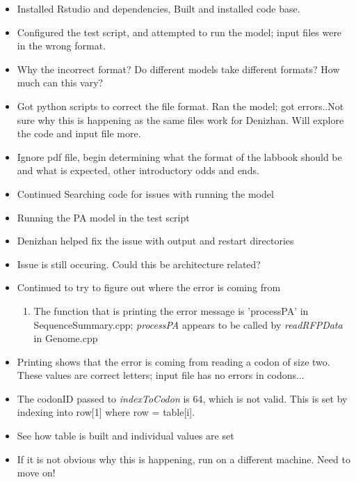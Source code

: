 \documentclass[12pt,hyperref]{labbook}
\begin{document}
\begin{itemize}
	\item Installed Rstudio and dependencies, Built and installed code base.
	\item Configured the test script, and attempted to run the model;
        input files were in the wrong format.
\end{itemize}
\begin{itemize}
  \item Why the incorrect format? Do different models take different formats?
How much can this vary?
\end{itemize}

 
\begin{itemize}
	\item Got python scripts to correct the file format. Ran the model;
got errors..Not sure why this is happening as the same files work for Denizhan.
Will explore the code and input file more.
	\item Ignore pdf file, begin determining what the format of the
labbook should be and what is expected, other introductory odds and ends.
  \item Continued Searching code for issues with running the model
\end{itemize}
\begin{itemize}
  \item Running the PA model in the test script
  \item Denizhan helped fix the issue with output and restart directories
  \item Issue is still occuring. Could this be architecture related?
\end{itemize}

\begin{itemize}
  \item Continued to try to figure out where the error is coming from
  \begin{enumerate}
    \item The function that is printing the error message is 'processPA' in
SequenceSummary.cpp; \textit{processPA} appears to be called by
\textit{readRFPData} in Genome.cpp
  \end{enumerate}
  \item Printing shows that the error is coming from reading a codon of size
two. These values are correct letters; input file has no errors in codons...
  \item The codonID passed to \textit{indexToCodon} is 64, which is not valid.
This is set by indexing into row[1] where row = table[i].
\end{itemize}
\begin{itemize}
  \item See how table is built and individual values are set
  \item If it is not obvious why this is happening, run on a different machine.
Need to move on! 
\end{itemize}
\end{document}
